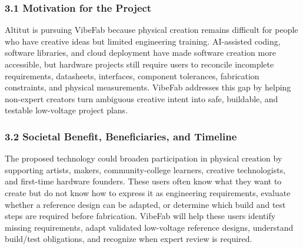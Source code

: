 




\subsubsection*{3.1 Motivation for the Project}

Altitut is pursuing VibeFab because physical creation remains difficult for people who have creative ideas but limited engineering training. AI-assisted coding, software libraries, and cloud deployment have made software creation more accessible, but hardware projects still require users to reconcile incomplete requirements, datasheets, interfaces, component tolerances, fabrication constraints, and physical measurements. VibeFab addresses this gap by helping non-expert creators turn ambiguous creative intent into safe, buildable, and testable low-voltage project plans.

\subsubsection*{3.2 Societal Benefit, Beneficiaries, and Timeline}

The proposed technology could broaden participation in physical creation by supporting artists, makers, community-college learners, creative technologists, and first-time hardware founders. These users often know what they want to create but do not know how to express it as engineering requirements, evaluate whether a reference design can be adapted, or determine which build and test steps are required before fabrication. VibeFab will help these users identify missing requirements, adapt validated low-voltage reference designs, understand build/test obligations, and recognize when expert review is required.

